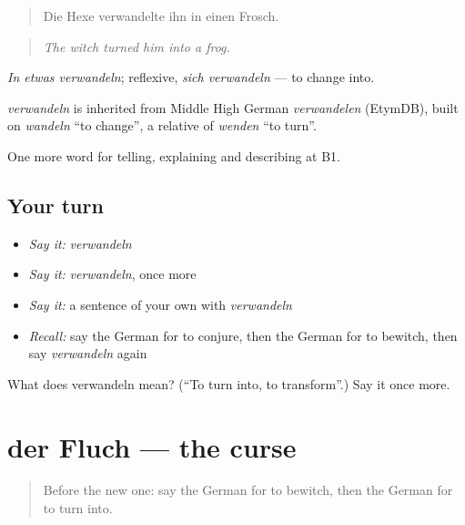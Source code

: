 \begin{quote}
Die Hexe verwandelte ihn in einen Frosch.
\end{quote}

\begin{quote}
\emph{The witch turned him into a frog.}
\end{quote}

\emph{In etwas verwandeln}; reflexive, \emph{sich verwandeln} — to change into.

\begin{cousinweb}
\emph{verwandeln} is inherited from Middle High German \emph{verwandelen} (EtymDB), built on \emph{wandeln} \textquotedblleft{}to change\textquotedblright{}, a relative of \emph{wenden} \textquotedblleft{}to turn\textquotedblright{}.
\end{cousinweb}

\begin{grammarlens}[title={What you've built}]
One more word for telling, explaining and describing at B1.
\end{grammarlens}

\subsection*{Your turn}
\begin{itemize}
\raggedright
  \item \emph{Say it:} \emph{verwandeln}
  \item \emph{Say it:} \emph{verwandeln}, once more
  \item \emph{Say it:} a sentence of your own with \emph{verwandeln}
  \item \emph{Recall:} say the German for to conjure, then the German for to bewitch, then say \emph{verwandeln} again
\end{itemize}

\begin{tcolorbox}[breakable,colback=teal!4,colframe=teal!35!black,title={Before you move on}]
What does verwandeln mean? (\textquotedblleft{}To turn into, to transform\textquotedblright{}.) Say it once more.
\end{tcolorbox}
\section[der Fluch]{der Fluch — the curse}

\label{lesson:GE-C314-fluch}



\begin{quote}
Before the new one: say the German for to bewitch, then the German for to turn into.
\end{quote}

